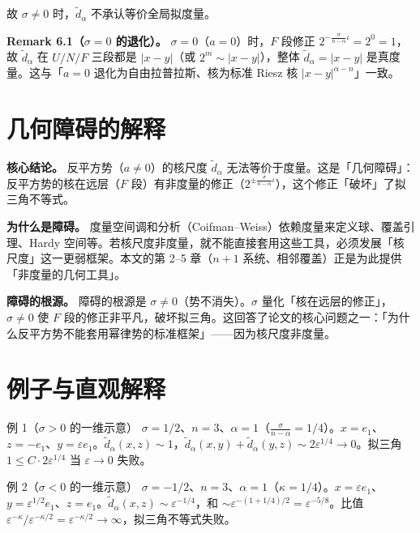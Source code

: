 \documentclass[a4paper,11pt,openany]{ctexbook}
\numberwithin{equation}{chapter}
\numberwithin{figure}{chapter}
\numberwithin{table}{chapter}
\begin{document}
故 $\sigma\neq0$ 时，$\widetilde d_\alpha$ 不承认等价全局拟度量。

\textbf{Remark 6.1（$\sigma=0$ 的退化）。} $\sigma=0$（$a=0$）时，$F$ 段修正 $2^{-\frac{\sigma}{n-\alpha}\iota}=2^0=1$，故 $\widetilde d_\alpha$ 在 $U/N/F$ 三段都是 $|x-y|$（或 $2^m\sim|x-y|$），整体 $\widetilde d_\alpha=|x-y|$ 是真度量。这与「$a=0$ 退化为自由拉普拉斯、核为标准 Riesz 核 $|x-y|^{\alpha-n}$」一致。

\section{几何障碍的解释}

\textbf{核心结论。} 反平方势（$a\neq0$）的核尺度 $\widetilde d_\alpha$ 无法等价于度量。这是「几何障碍」：反平方势的核在远层（$F$ 段）有非度量的修正（$2^{\pm\frac{\sigma}{n-\alpha}\iota}$），这个修正「破坏」了拟三角不等式。

\textbf{为什么是障碍。} 度量空间调和分析（Coifman–Weiss）依赖度量来定义球、覆盖引理、Hardy 空间等。若核尺度非度量，就不能直接套用这些工具，必须发展「核尺度」这一更弱框架。本文的第 2–5 章（$n+1$ 系统、相邻覆盖）正是为此提供「非度量的几何工具」。

\textbf{障碍的根源。} 障碍的根源是 $\sigma\neq0$（势不消失）。$\sigma$ 量化「核在远层的修正」，$\sigma\neq0$ 使 $F$ 段的修正非平凡，破坏拟三角。这回答了论文的核心问题之一：「为什么反平方势不能套用幂律势的标准框架」——因为核尺度非度量。

\section{例子与直观解释}

\begin{examplebox}{例 1（$\sigma>0$ 的一维示意）}
$\sigma=1/2$、$n=3$、$\alpha=1$（$\frac{\sigma}{n-\alpha}=1/4$）。$x=e_1$、$z=-e_1$、$y=\varepsilon e_1$。$\widetilde d_\alpha(x,z)\sim1$，$\widetilde d_\alpha(x,y)+\widetilde d_\alpha(y,z)\sim2\varepsilon^{1/4}\to0$。拟三角 $1\le C\cdot2\varepsilon^{1/4}$ 当 $\varepsilon\to0$ 失败。
\end{examplebox}

\begin{examplebox}{例 2（$\sigma<0$ 的一维示意）}
$\sigma=-1/2$、$n=3$、$\alpha=1$（$\kappa=1/4$）。$x=\varepsilon e_1$、$y=\varepsilon^{1/2}e_1$、$z=e_1$。$\widetilde d_\alpha(x,z)\sim\varepsilon^{-1/4}$，和 $\sim\varepsilon^{-(1+1/4)/2}=\varepsilon^{-5/8}$。比值 $\varepsilon^{-\kappa}/\varepsilon^{-\kappa/2}=\varepsilon^{-\kappa/2}\to\infty$，拟三角不等式失败。
\end{examplebox}
\end{document}

